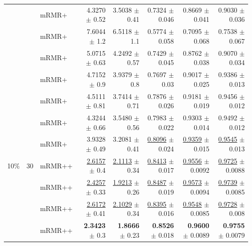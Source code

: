 \begin{longtable}{llp{}rrrrr}
 &  & mRMR+ & 4.3270 {\scriptsize $\pm$ 0.52} & 3.5038 {\scriptsize $\pm$ 0.41} & 0.7324 {\scriptsize $\pm$ 0.046} & 0.8669 {\scriptsize $\pm$ 0.041} & 0.9030 {\scriptsize $\pm$ 0.036} \\
 &  & mRMR+ & 7.6044 {\scriptsize $\pm$ 1.2} & 6.5118 {\scriptsize $\pm$ 1.1} & 0.5774 {\scriptsize $\pm$ 0.058} & 0.7095 {\scriptsize $\pm$ 0.068} & 0.7538 {\scriptsize $\pm$ 0.067} \\
 &  & mRMR+ & 5.0715 {\scriptsize $\pm$ 0.63} & 4.2492 {\scriptsize $\pm$ 0.57} & 0.7429 {\scriptsize $\pm$ 0.045} & 0.8762 {\scriptsize $\pm$ 0.038} & 0.9070 {\scriptsize $\pm$ 0.034} \\
 &  & mRMR+ & 4.7152 {\scriptsize $\pm$ 0.9} & 3.9379 {\scriptsize $\pm$ 0.8} & 0.7697 {\scriptsize $\pm$ 0.03} & 0.9017 {\scriptsize $\pm$ 0.025} & 0.9386 {\scriptsize $\pm$ 0.013} \\
 &  & mRMR+ & 4.5111 {\scriptsize $\pm$ 0.81} & 3.7414 {\scriptsize $\pm$ 0.71} & 0.7876 {\scriptsize $\pm$ 0.026} & 0.9181 {\scriptsize $\pm$ 0.019} & 0.9456 {\scriptsize $\pm$ 0.012} \\
 &  & mRMR+ & 4.3244 {\scriptsize $\pm$ 0.66} & 3.5480 {\scriptsize $\pm$ 0.56} & 0.7983 {\scriptsize $\pm$ 0.022} & 0.9303 {\scriptsize $\pm$ 0.014} & 0.9492 {\scriptsize $\pm$ 0.012} \\
 &  & mRMR+ & 3.9328 {\scriptsize $\pm$ 0.49} & 3.2081 {\scriptsize $\pm$ 0.41} & \underline{0.8096} {\scriptsize $\pm$ 0.024} & \underline{0.9359} {\scriptsize $\pm$ 0.015} & \underline{0.9545} {\scriptsize $\pm$ 0.013} \\
\midrule
10\% & 30 & mRMR++ & \underline{2.6157} {\scriptsize $\pm$ 0.4} & \underline{2.1113} {\scriptsize $\pm$ 0.34} & \underline{0.8413} {\scriptsize $\pm$ 0.017} & \underline{0.9556} {\scriptsize $\pm$ 0.0092} & \underline{0.9725} {\scriptsize $\pm$ 0.0088} \\
 &  & mRMR++ & \underline{2.4257} {\scriptsize $\pm$ 0.33} & \underline{1.9213} {\scriptsize $\pm$ 0.26} & \underline{0.8487} {\scriptsize $\pm$ 0.019} & \underline{0.9573} {\scriptsize $\pm$ 0.0094} & \underline{0.9739} {\scriptsize $\pm$ 0.0085} \\
 &  & mRMR++ & \underline{2.6172} {\scriptsize $\pm$ 0.41} & \underline{2.1029} {\scriptsize $\pm$ 0.34} & \underline{0.8395} {\scriptsize $\pm$ 0.016} & \underline{0.9548} {\scriptsize $\pm$ 0.0085} & \underline{0.9728} {\scriptsize $\pm$ 0.008} \\
 &  & mRMR++ & \textbf{2.3423} {\scriptsize $\pm$ 0.3} & \textbf{1.8666} {\scriptsize $\pm$ 0.23} & \textbf{0.8526} {\scriptsize $\pm$ 0.018} & \textbf{0.9600} {\scriptsize $\pm$ 0.0089} & \textbf{0.9755} {\scriptsize $\pm$ 0.0079} \\

\end{longtable}
